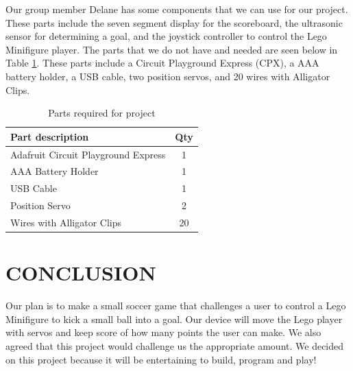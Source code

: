 \documentclass[12pt]{article}
\begin{document}
Our group member Delane has some components that we can use for our project. These parts include the seven segment display for the
scoreboard, the ultrasonic sensor for determining a goal, and the joystick controller to control the Lego Minifigure player.
The parts that we do not have and needed are seen below in Table \ref{table:parts_list}. These parts include a Circuit Playground Express (CPX),
 a AAA battery holder, a USB cable, two position servos, and 20 wires with Alligator Clips.

\begin{table}[ht]
  \caption{Parts required for project}
  \label{table:parts_list}
  \begin{center}
  \begin{tabular}{|p{3in}|c|}
  
  \hline
  Part description & Qty\\
  \hline
  \hline
  Adafruit Circuit Playground Express & 1 \\
  \hline
  AAA Battery Holder & 1 \\
  \hline
  USB Cable & 1 \\
  \hline
  Position Servo & 2\\
  \hline 
  Wires with Alligator Clips & 20\\
  \hline
 
  
  \end{tabular}
  \end{center}
  \end{table}


\newpage

\section{CONCLUSION}

Our plan is to make a small soccer game that challenges a user to control a Lego Minifigure to kick a small ball into a goal. Our device will move the Lego player with servos and keep score of how many points the user can make.  We also agreed that this project would challenge us the appropriate amount. We decided on this project because it will be entertaining to build, program and play!















\newpage
\printbibliography[heading=subbibintoc]
%
%
\end{document}
